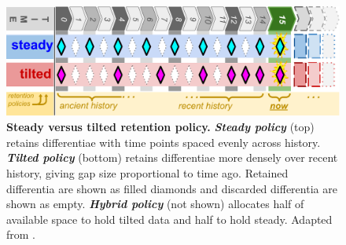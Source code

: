 \begin{figure}
\begin{minipage}{0.65\linewidth}
  \centering
  \includegraphics[width=0.9\linewidth]{img/steady-vs-tilted-schematic}
\end{minipage}%
\begin{minipage}{0.35\textwidth}
  \caption{%
  \textbf{Steady versus tilted retention policy.}
  \footnotesize
  \textbf{\textit{Steady policy}} (top) retains differentiae with time points spaced evenly across history.
  \textbf{\textit{Tilted policy}} (bottom) retains differentiae more densely over recent history, giving gap size proportional to time ago.
  Retained differentia are shown as filled diamonds and discarded differentia are shown as empty.
  \textbf{\textit{Hybrid policy}} (not shown) allocates half of available space to hold tilted data and half to hold steady.
  Adapted from \citep{moreno2025testing}.
  }
  \label{fig:steady-vs-tilted-schematic}
\end{minipage}
\end{figure}
